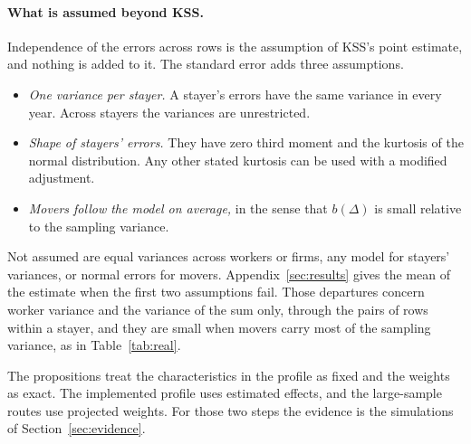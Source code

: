 \paragraph{What is assumed beyond KSS.}
Independence of the errors across rows is the assumption of KSS's point estimate, and
nothing is added to it. The standard error adds three assumptions.
\begin{itemize}
\item \emph{One variance per stayer.} A stayer's errors have the same variance in
every year. Across stayers the variances are unrestricted.
\item \emph{Shape of stayers' errors.} They have zero third moment and the kurtosis of
the normal distribution. Any other stated kurtosis can be used with a modified
adjustment.
\item \emph{Movers follow the model on average,} in the sense that $b(\Delta)$ is small
relative to the sampling variance.
\end{itemize}
Not assumed are equal variances across workers or firms, any model for stayers'
variances, or normal errors for movers. Appendix~\ref{sec:results} gives the mean of
the estimate when the first two assumptions fail. Those departures concern worker
variance and the variance of the sum only, through the pairs of rows within a stayer,
and they are small when movers carry most of the sampling variance, as in
Table~\ref{tab:real}.

The propositions treat the characteristics in the profile as fixed and the weights as
exact. The implemented profile uses estimated effects, and the large-sample routes use
projected weights. For those two steps the evidence is the simulations of
Section~\ref{sec:evidence}.
